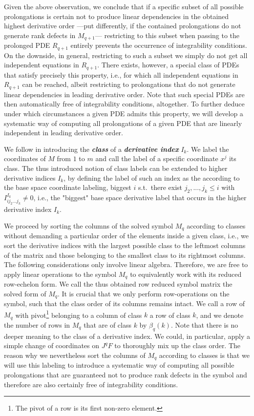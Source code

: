 Given the above observation, we conclude that if a specific subset of all possible prolongations is certain not to produce linear dependencies in the obtained highest derivative order ---put differently, if the contained prolongations do not generate rank defects in $M_{q+1}$---
restricting to this subset when passing to the prolonged PDE $R_{q+1}$ entirely prevents the occurrence of integrability conditions. On the downside, in general, restricting to such a subset we simply do not get all independent equations in $R_{q+1}$. There exists, however, a special class of PDEs that satisfy precisely this property, i.e., for which all independent equations in $R_{q+1}$ can be reached, albeit restricting to prolongations that do not generate linear dependencies in leading derivative order. Note that such special PDEs are then automatically free of integrability conditions, altogether. 
To further deduce under which circumstances a given PDE admits this property, we will develop a systematic way of computing all prolongations of a given PDE that are linearly independent in leading derivative order.

We follow \cite{seiler1994analysis} in introducing the \textit{\textbf{class}} of a \textit{\textbf{derivative index}} $I_k$. We label the coordinates of $M$ from $1$ to $m$ and call the label of a specific coordinate $x^j$ its class. The thus introduced notion of class labels can be extended to higher derivative indices $I_k$, by defining the label of such an index as the according to the base space coordinate labeling, biggest $i$ s.t.\ there exist $j_2,...,j_k\leq i$ with $I^{I_k}_{ij_2...j_k} \neq 0$, i.e., the "biggest" base space derivative label that occurs in the higher derivative index $I_k$.

We proceed by sorting the columns of the solved symbol $M_q$ according to classes without demanding a particular order of the elements inside a given class, i.e., we sort the derivative indices with the largest possible class to the leftmost columns of the matrix and those belonging to the smallest class to its rightmost columns.
The following considerations only involve linear algebra. Therefore, we are free to apply linear operations to the symbol $M_q$ to equivalently work with its reduced row-echelon form. We call the thus obtained row reduced symbol matrix the solved form of $M_q$. 
It is crucial that we only perform row-operations on the symbol, such that the class order of its columns remains intact.
We call a row of $M_q$ with pivot\footnote{The pivot of a row is its first non-zero element.} belonging to a column of class $k$ a row of class $k$, and we denote the number of rows in $M_q$ that are of class $k$ by $\beta_q(k)$. Note that there is no deeper meaning to the class of a derivative index. We could, in particular, apply a simple change of coordinates on $J^qF$ to thoroughly mix up the class order. The reason why we nevertheless sort the columns of $M_q$ according to classes is that we will use this labeling to introduce a systematic way of computing all possible prolongations that are guaranteed not to produce rank defects in the symbol and therefore are also certainly free of integrability conditions.

